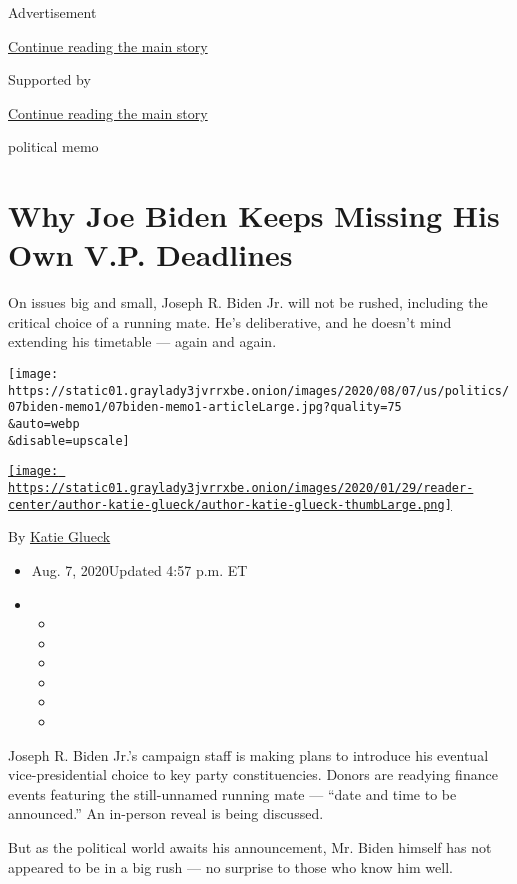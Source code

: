 Advertisement

\protect\hyperlink{after-top}{Continue reading the main story}

Supported by

\protect\hyperlink{after-sponsor}{Continue reading the main story}

political memo

\hypertarget{why-joe-biden-keeps-missing-his-own-vp-deadlines}{%
\section{Why Joe Biden Keeps Missing His Own V.P.
Deadlines}\label{why-joe-biden-keeps-missing-his-own-vp-deadlines}}

On issues big and small, Joseph R. Biden Jr. will not be rushed,
including the critical choice of a running mate. He's deliberative, and
he doesn't mind extending his timetable --- again and again.

\texttt{[image: https://static01.graylady3jvrrxbe.onion/images/2020/08/07/us/politics/07biden-memo1/07biden-memo1-articleLarge.jpg?quality=75\\\&auto=webp\\\&disable=upscale]}

\href{https://www.nytimes3xbfgragh.onion/by/katie-glueck}{\texttt{[image: https://static01.graylady3jvrrxbe.onion/images/2020/01/29/reader-center/author-katie-glueck/author-katie-glueck-thumbLarge.png]}}

By \href{https://www.nytimes3xbfgragh.onion/by/katie-glueck}{Katie
Glueck}

\begin{itemize}
\item
  Aug. 7, 2020Updated 4:57 p.m. ET
\item
  \begin{itemize}
  \item
  \item
  \item
  \item
  \item
  \item
  \end{itemize}
\end{itemize}

Joseph R. Biden Jr.'s campaign staff is making plans to introduce his
eventual vice-presidential choice to key party constituencies. Donors
are readying finance events featuring the still-unnamed running mate ---
``date and time to be announced.'' An in-person reveal is being
discussed.

But as the political world awaits his announcement, Mr. Biden himself
has not appeared to be in a big rush --- no surprise to those who know
him well.

